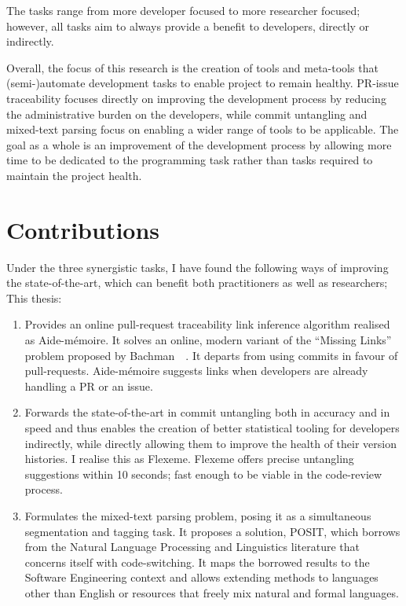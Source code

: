 \noindent The tasks range from more developer focused to more researcher
focused; however, all tasks aim to always provide a benefit to developers,
directly or indirectly.

Overall, the focus of this research is the creation of tools and
meta-tools that (semi-)automate development tasks to enable project to remain
healthy. PR-issue traceability focuses directly on improving the development
process by reducing the administrative burden on the developers, while commit
untangling and mixed-text parsing focus on enabling a wider range of tools to be
applicable. The goal as a whole is an improvement of the development process by
allowing more time to be dedicated to the programming task rather than tasks
required to maintain the project health.

\section{Contributions}
\label{chapter:introduction:sec:contrib}

Under the three synergistic tasks, I have found the following ways of improving
the state-of-the-art, which can benefit both practitioners as well as
researchers; This thesis:

\begin{enumerate}
    \item Provides an online pull-request traceability link inference algorithm
    realised as Aide-mémoire. It solves an online, modern variant of the
    ``Missing Links'' problem proposed by Bachman~\etal~\cite{MissingLinks}. It
    departs from using commits in favour of pull-requests. Aide-mémoire suggests
    links when developers are already handling a PR or an issue.

    \item Forwards the state-of-the-art in commit untangling both in accuracy
    and in speed and thus enables the creation of better statistical tooling for
    developers indirectly, while directly allowing them to improve the health of
    their version histories. I realise this as Flexeme. Flexeme offers precise
    untangling suggestions within 10 seconds; fast enough to be viable in the
    code-review process.

    \item Formulates the mixed-text parsing problem, posing it as a simultaneous
    segmentation and tagging task. It proposes a solution, POSIT, which borrows
    from the Natural Language Processing and Linguistics literature that
    concerns itself with code-switching. It maps the borrowed results to the
    Software Engineering context and allows extending methods to languages other
    than English or resources that freely mix natural and formal languages.
\end{enumerate}

